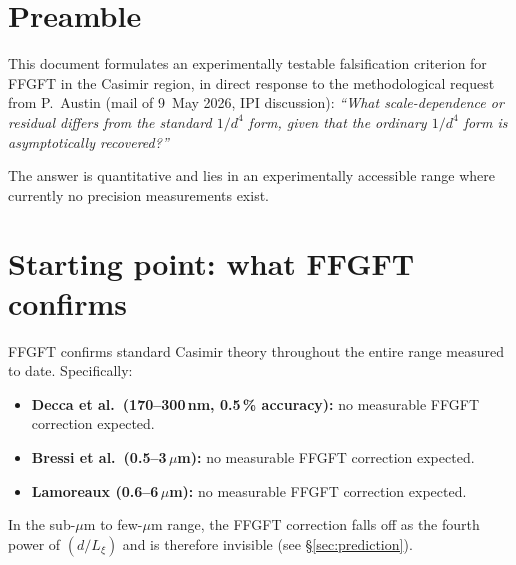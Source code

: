 
\section*{Preamble}

This document formulates an experimentally testable falsification
criterion for FFGFT in the Casimir region, in direct response to
the methodological request from P.~Austin (mail of 9~May 2026, IPI
discussion): \emph{\enquote{What scale-dependence or residual differs
from the standard $1/d^4$ form, given that the ordinary $1/d^4$ form
is asymptotically recovered?}}

The answer is quantitative and lies in an experimentally accessible
range where currently no precision measurements exist.

\section{Starting point: what FFGFT confirms}

FFGFT confirms standard Casimir theory throughout the entire range
measured to date. Specifically:

\begin{itemize}[leftmargin=2em,itemsep=2pt,topsep=2pt]
  \item \textbf{Decca et al.\ (170--300\,nm, 0.5\,\% accuracy):}
        no measurable FFGFT correction expected.
  \item \textbf{Bressi et al.\ (0.5--3\,$\mu$m):} no measurable
        FFGFT correction expected.
  \item \textbf{Lamoreaux (0.6--6\,$\mu$m):} no measurable
        FFGFT correction expected.
\end{itemize}

In the sub-$\mu$m to few-$\mu$m range, the FFGFT correction falls
off as the fourth power of $(d/L_\xi)$ and is therefore invisible
(see §\ref{sec:prediction}).

